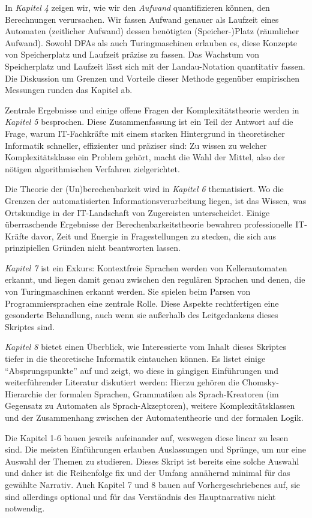 In \emph{Kapitel 4} zeigen wir, 
wie wir den \emph{Aufwand} quantifizieren können,
den Berechnungen verursachen. 
Wir fassen Aufwand genauer als Laufzeit eines Automaten (zeitlicher Aufwand) 
dessen benötigten (Speicher-)Platz (räumlicher Aufwand).
Sowohl DFAs als auch Turingmaschinen erlauben es,
diese Konzepte von Speicherplatz und Laufzeit präzise zu fassen.
Das Wachstum von Speicherplatz und Laufzeit lässt sich
mit der Landau-Notation quantitativ fassen.
Die Diskussion um Grenzen und Vorteile dieser Methode
gegenüber empirischen Messungen runden das Kapitel ab.

Zentrale Ergebnisse und einige offene Fragen der Komplexitätstheorie
werden in \emph{Kapitel 5} besprochen.
Diese Zusammenfassung ist ein Teil der Antwort auf die Frage,
warum IT-Fachkräfte mit einem starken Hintergrund in theoretischer Informatik
schneller, effizienter und präziser sind:
Zu wissen zu welcher Komplexitätsklasse ein Problem gehört,
macht die Wahl der Mittel,
also der nötigen algorithmischen Verfahren zielgerichtet.

Die Theorie der (Un)berechenbarkeit wird in \emph{Kapitel 6} thematisiert.
Wo die Grenzen der automatisierten Informationsverarbeitung liegen,
ist das Wissen,
was Ortskundige in der IT-Landschaft von Zugereisten unterscheidet.
Einige überraschende Ergebnisse der Berechenbarkeitstheorie
bewahren professionelle IT-Kräfte davor,
Zeit und Energie in Fragestellungen zu stecken,
die sich aus prinzipiellen Gründen nicht beantworten lassen.

\emph{Kapitel 7} ist ein Exkurs: Kontextfreie Sprachen werden von Kellerautomaten erkannt,
und liegen damit genau zwischen den regulären Sprachen
und denen, die von Turingmaschinen erkannt werden.
Sie spielen beim Parsen von Programmiersprachen eine zentrale Rolle.
Diese Aspekte rechtfertigen eine gesonderte Behandlung,
auch wenn sie außerhalb des Leitgedankens dieses Skriptes sind.

\emph{Kapitel 8} bietet einen Überblick,
wie Interessierte vom Inhalt dieses Skriptes tiefer in die theoretische Informatik
eintauchen können.
Es listet einige ``Absprungspunkte'' auf und zeigt,
wo diese in gängigen Einführungen und weiterführender Literatur diskutiert werden:
Hierzu gehören die Chomsky-Hierarchie der formalen Sprachen,
Grammatiken als Sprach-Kreatoren (im Gegensatz zu Automaten als Sprach-Akzeptoren),
weitere Komplexitätsklassen und
der Zusammenhang zwischen der Automatentheorie und der formalen Logik.

Die Kapitel 1-6 bauen jeweils aufeinander auf,
weswegen diese linear zu lesen sind.
Die meisten Einführungen erlauben Auslassungen und Sprünge,
um nur eine Auswahl der Themen zu studieren.
Dieses Skript ist bereits eine solche Auswahl
und daher ist die Reihenfolge fix
und der Umfang annähernd minimal für das gewählte Narrativ.
Auch Kapitel 7 und 8 bauen auf Vorhergeschriebenes auf,
sie sind allerdings optional
und für das Verständnis des Hauptnarrativs nicht notwendig.

